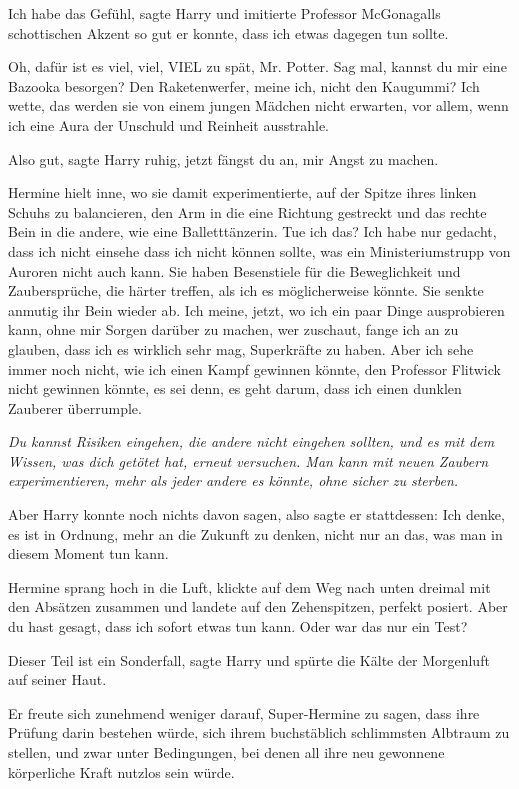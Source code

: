 \glqq{}Ich habe das Gefühl\grqq{}, sagte Harry und imitierte Professor
McGonagalls schottischen Akzent so gut er konnte, \glqq{}dass ich etwas dagegen
tun sollte.\grqq{}

\glqq{}Oh, dafür ist es viel, viel, VIEL zu spät, Mr. Potter. Sag mal, kannst du
mir eine Bazooka besorgen? Den Raketenwerfer, meine ich, nicht den Kaugummi? Ich
wette, das werden sie von einem jungen Mädchen nicht erwarten, vor allem, wenn
ich eine Aura der Unschuld und Reinheit ausstrahle.\grqq{}

\glqq{}Also gut\grqq{}, sagte Harry ruhig, \glqq{}jetzt fängst du an, mir Angst zu
machen.\grqq{}

Hermine hielt inne, wo sie damit experimentierte, auf der Spitze ihres linken
Schuhs zu balancieren, den Arm in die eine Richtung gestreckt und das rechte
Bein in die andere, wie eine Balletttänzerin. \glqq{}Tue ich das? Ich habe nur
gedacht, dass ich nicht einsehe dass ich nicht können sollte, was ein
Ministeriumstrupp von Auroren nicht auch kann. Sie haben Besenstiele für die
Beweglichkeit und Zaubersprüche, die härter treffen, als ich es möglicherweise
könnte.\grqq{} Sie senkte anmutig ihr Bein wieder ab. \glqq{}Ich meine, jetzt, wo ich
ein paar Dinge ausprobieren kann, ohne mir Sorgen darüber zu machen, wer
zuschaut, fange ich an zu glauben, dass ich es wirklich sehr mag, Superkräfte zu
haben. Aber ich sehe immer noch nicht, wie ich einen Kampf gewinnen könnte, den
Professor Flitwick nicht gewinnen könnte, es sei denn, es geht darum, dass ich
einen dunklen Zauberer überrumple.\grqq{}

\emph{Du kannst Risiken eingehen, die andere nicht eingehen sollten, und es mit
dem Wissen, was dich getötet hat, erneut versuchen. Man kann mit neuen Zaubern
experimentieren, mehr als jeder andere es könnte, ohne sicher zu sterben.}

Aber Harry konnte noch nichts davon sagen, also sagte er stattdessen: \glqq{}Ich
denke, es ist in Ordnung, mehr an die Zukunft zu denken, nicht nur an das, was
man in diesem Moment tun kann.\grqq{}

Hermine sprang hoch in die Luft, klickte auf dem Weg nach unten dreimal mit den
Absätzen zusammen und landete auf den Zehenspitzen, perfekt posiert. \glqq{}Aber
du hast gesagt, dass ich sofort etwas tun kann. Oder war das nur ein Test?\grqq{}

\glqq{}Dieser Teil ist ein Sonderfall\grqq{}, sagte Harry und spürte die Kälte
der Morgenluft auf seiner Haut.

Er freute sich zunehmend weniger darauf, Super-Hermine zu sagen, dass ihre
Prüfung darin bestehen würde, sich ihrem buchstäblich schlimmsten Albtraum zu
stellen, und zwar unter Bedingungen, bei denen all ihre neu gewonnene
körperliche Kraft nutzlos sein würde.

